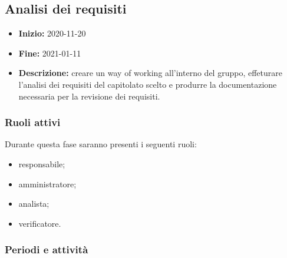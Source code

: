 
\subsection{Analisi dei requisiti} \label{_pianificazioneAnalisiDeiRequisiti}
\begin{itemize}
    \item []\textbf{Inizio:} 2020-11-20
    \item []\textbf{Fine:} 2021-01-11
    \item []\textbf{Descrizione:} creare un way of working all'interno del gruppo, effeturare l'analisi dei requisiti del capitolato scelto e produrre la documentazione necessaria per la revisione dei requisiti.
\end{itemize}

\subsubsection{Ruoli attivi}
Durante questa fase saranno presenti i seguenti ruoli:
\begin{itemize}
    \item responsabile;
    \item amministratore;
    \item analista;
    \item verificatore.
\end{itemize}

\subsubsection{Periodi e attività}

